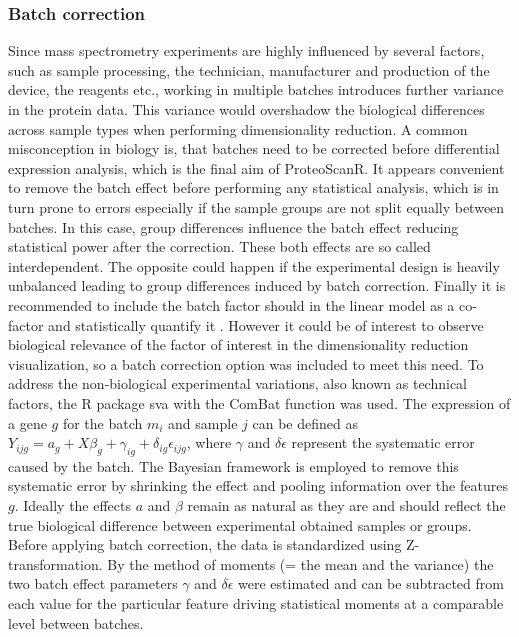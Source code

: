 \documentclass[
  11pt,
]{article}
\begin{document}
\hypertarget{batch-correction}{%
\subsubsection{Batch correction}\label{batch-correction}}

Since mass spectrometry experiments are highly influenced by several factors, such as sample processing, the technician, manufacturer and production of the device, the reagents etc., working in multiple batches introduces further variance in the protein data. This variance would overshadow the biological differences across sample types when performing dimensionality reduction. A common misconception in biology is, that batches need to be corrected before differential expression analysis, which is the final aim of ProteoScanR. It appears convenient to remove the batch effect before performing any statistical analysis, which is in turn prone to errors especially if the sample groups are not split equally between batches. In this case, group differences influence the batch effect reducing statistical power after the correction. These both effects are so called interdependent. The opposite could happen if the experimental design is heavily unbalanced leading to group differences induced by batch correction.
Finally it is recommended to include the batch factor should in the linear model as a co-factor and statistically quantify it \citep{Nygaard2016}.
However it could be of interest to observe biological relevance of the factor of interest in the dimensionality reduction visualization, so a batch correction option was included to meet this need.
To address the non-biological experimental variations, also known as technical factors, the R package sva \citep{Leek2012} with the ComBat function \citep{Johnson2007} was used.
The expression of a gene \(g\) for the batch \(m_i\) and sample \(j\) can be defined as \(Y_{ijg} = a_{g} + X\beta_{g} + \gamma_{ig} + \delta_{ig}\epsilon_{ijg}\), where \(\gamma\) and \(\delta\epsilon\) represent the systematic error caused by the batch.
The Bayesian framework is employed to remove this systematic error by shrinking the effect and pooling information over the features \(g\). Ideally the effects \(a\) and \(\beta\) remain as natural as they are and should reflect the true biological difference between experimental obtained samples or groups. Before applying batch correction, the data is standardized using Z-transformation. By the method of moments (= the mean and the variance) the two batch effect parameters \(\gamma\) and \(\delta\epsilon\) were estimated and can be subtracted from each value for the particular feature driving statistical moments at a comparable level between batches.
\end{document}
